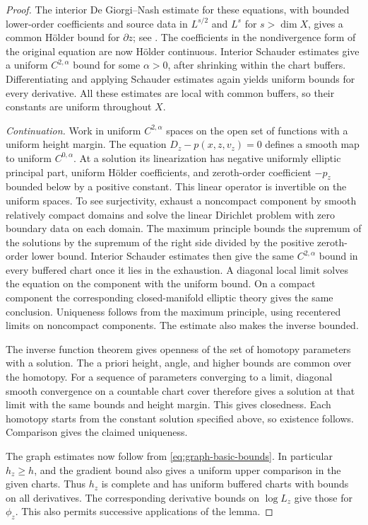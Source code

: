 \begin{proof}
The interior De Giorgi--Nash estimate for these equations, with
bounded lower-order coefficients and source data in \(L^{s/2}\)
and \(L^s\) for \(s>\dim X\), gives a common Hölder bound for
\(\partial z\); see \cite[Theorem~8.24]{GilbargTrudinger}.
The coefficients in the nondivergence form of the original
equation are now Hölder continuous.  Interior Schauder estimates
give a uniform \(C^{2,\alpha}\) bound for some \(\alpha>0\), after
shrinking within the chart buffers.  Differentiating and applying
Schauder estimates again yields uniform bounds for every
derivative.  All these estimates are local with common buffers, so
their constants are uniform throughout \(X\).

\emph{Continuation.}
Work in uniform \(C^{2,\alpha}\) spaces on the open set of functions
with a uniform height margin.  The equation \(D_z-p(x,z,v_z)=0\)
defines a smooth map to uniform \(C^{0,\alpha}\).  At a solution
its linearization has negative uniformly elliptic principal part,
uniform Hölder coefficients, and zeroth-order coefficient
\(-p_z\) bounded below by a positive constant.  This linear
operator is invertible on the uniform spaces.  To see
surjectivity, exhaust a noncompact component by smooth relatively
compact domains and solve the linear Dirichlet problem with zero
boundary data on each domain.  The maximum principle bounds the
supremum of the solutions by the supremum of the right side
divided by the positive zeroth-order lower bound.  Interior
Schauder estimates then give the same \(C^{2,\alpha}\) bound in
every buffered chart once it lies in the exhaustion.  A diagonal
local limit solves the equation on the component with the uniform
bound.  On a compact component the corresponding closed-manifold
elliptic theory gives the same conclusion.  Uniqueness follows
from the maximum principle, using recentered limits on noncompact
components.  The estimate also makes the inverse bounded.

The inverse function theorem gives openness of the set of
homotopy parameters with a solution.  The a priori height, angle,
and higher bounds are common over the homotopy.  For a sequence
of parameters converging to a limit, diagonal smooth convergence
on a countable chart cover therefore gives a solution at that
limit with the same bounds and height margin.  This gives
closedness.  Each homotopy starts from the constant solution
specified above, so existence follows.  Comparison gives the
claimed uniqueness.

The graph estimates now follow from
\eqref{eq:graph-basic-bounds}.  In particular \(h_z\ge h\), and
the gradient bound also gives a uniform upper comparison in the
given charts.  Thus \(h_z\) is complete and has uniform buffered
charts with bounds on all derivatives.  The corresponding
derivative bounds on \(\log L_z\) give those for \(\phi_z\).
This also permits successive applications of the lemma.


\end{proof}
